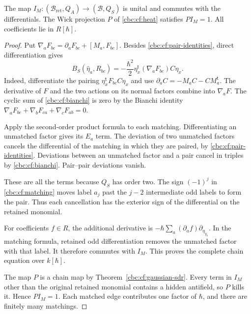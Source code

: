 \begin{theorem}\label{cbc:cf:matching-theorem}
The map
$I_M:(\mathcal B_{\mathrm{ret}},Q_A)\to(\mathcal B,Q_S)$
is unital and commutes with the differentials. The Wick
projection $P$ of \eqref{cbc:cf:heat} satisfies $PI_M=1$.
All coefficients lie in $R[\hbar]$.
\end{theorem}
\begin{proof}
Put $\nabla_aF_{bc}=\partial_aF_{bc}+[M_a,F_{bc}]$.
Besides \eqref{cbc:cf:pair-identities}, direct differentiation
gives
\begin{equation}\label{cbc:cf:bianchi}
 B_S(\widehat\eta_a,R_{bc})
   =-\frac{\hbar^2}{2}
       \eta_x^{\mathsf t}(\nabla_aF_{bc})C\eta_x.
\end{equation}
Indeed, differentiate the pairing
$\eta_x^{\mathsf t}F_{bc}C\eta_x$ and use
$\partial_aC=-M_aC-CM_a^{\mathsf t}$.
The derivative of $F$ and the two actions on its normal
factors combine into $\nabla_aF$. The cyclic sum of
\eqref{cbc:cf:bianchi} is zero by the Bianchi identity
$\nabla_aF_{bc}+\nabla_bF_{ca}+\nabla_cF_{ab}=0$.

Apply the second-order product formula to each matching.
Differentiating an unmatched factor gives its $E_a$ term.
The deviation of two unmatched factors cancels the differential
of the matching in which they are paired, by
\eqref{cbc:cf:pair-identities}. Deviations between an unmatched
factor and a pair cancel in triples by \eqref{cbc:cf:bianchi}.
Pair--pair deviations vanish.

These are all the terms because
$Q_S$ has order two. The sign $(-1)^j$ in
\eqref{cbc:cf:matching} moves label $a_j$ past the $j-2$
intermediate odd labels to form the pair. Thus each cancellation
has the exterior sign of the differential on the retained
monomial.

For coefficients $f\in R$, the additional derivative is
$-\hbar\sum_a(\partial_af)\partial_{\eta_{y_a}}$.
In the matching formula, retained odd differentiation removes
the unmatched factor with that label. It therefore commutes with $I_M$.
This proves the complete chain equation over $k[\hbar]$.

The map $P$ is a chain map by
Theorem~\ref{cbc:cf:gaussian-sdr}. Every term in $I_M$ other
than the original retained monomial contains a hidden antifield,
so $P$ kills it. Hence $PI_M=1$. Each matched edge contributes
one factor of $\hbar$, and there are finitely many matchings.
\end{proof}


